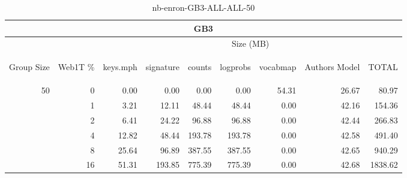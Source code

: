 \begin{center}
\begin{table}[htbp]
\begin{tabular}{ | r | r | r | r | r | r | r | r | r |}
\hline
\multicolumn{9}{|c|}{GB3}\\
\hline
 & & \multicolumn{7}{|c|}{Size (MB)}\\ \cline{3-9}
\begin{sideways}Group Size\end{sideways} & \begin{sideways}Web1T \% \end{sideways} & \begin{sideways}keys.mph\end{sideways} & \begin{sideways}signature\end{sideways} & \begin{sideways}counts\end{sideways} & \begin{sideways}logprobs\end{sideways} & \begin{sideways}vocabmap\end{sideways} & \begin{sideways}Authors Model \end{sideways} & \begin{sideways}TOTAL\end{sideways}\\
\hline
\multirow{5}{*}{50}
 & 0 & 0.00 & 0.00 & 0.00 & 0.00 & 54.31 & 26.67 & 80.97\\ \cline{2-9}
 & 1 & 3.21 & 12.11 & 48.44 & 48.44 & 0.00 & 42.16 & 154.36\\ \cline{2-9}
 & 2 & 6.41 & 24.22 & 96.88 & 96.88 & 0.00 & 42.44 & 266.83\\ \cline{2-9}
 & 4 & 12.82 & 48.44 & 193.78 & 193.78 & 0.00 & 42.58 & 491.40\\ \cline{2-9}
 & 8 & 25.64 & 96.89 & 387.55 & 387.55 & 0.00 & 42.65 & 940.29\\ \cline{2-9}
 & 16 & 51.31 & 193.85 & 775.39 & 775.39 & 0.00 & 42.68 & 1838.62\\ \cline{2-9}
\hline
\end{tabular}
\caption{nb-enron-GB3-ALL-ALL-50}
\label{table:nb-enron-GB3-ALL-ALL-50}
\end{table}
\end{center}

